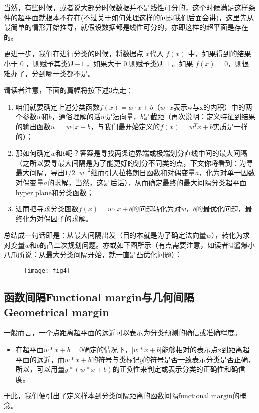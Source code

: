\documentclass[a4paper,12pt]{article}
\begin{document}
当然，有些时候，或者说大部分时候数据并不是线性可分的，这个时候满足这样条件的超平面就根本不存在(不过关于如何处理这样的问题我们后面会讲)，这里先从最简单的情形开始推导，就假设数据都是线性可分的，亦即这样的超平面是存在的。
    
更进一步，我们在进行分类的时候，将数据点 $x$代入 $f(x)$ 中，如果得到的结果小于 $0$ ，则赋予其类别$ -1$ ，如果大于 $0$ 则赋予类别 $1$ 。如果 $f(x)=0$，则很难办了，分到哪一类都不是。

请读者注意，下面的篇幅将按下述3点走：
\begin{enumerate}
\item 咱们就要确定上述分类函数$f(x) = w\cdot x + b$（$w\cdot x$表示w与x的内积）中的两个参数$w$和$b$，通俗理解的话$w$是法向量，$b$是截距（再次说明：定义特征到结果的输出函数$u=\vert w\cdot \vert x-b$，与我们最开始定义的$f(x)=w^Tx+b$实质是一样的）；
\item 那如何确定$w$和$b$呢？答案是寻找两条边界端或极端划分直线中间的最大间隔（之所以要寻最大间隔是为了能更好的划分不同类的点，下文你将看到：为寻最大间隔，导出$1/2||w||^2$继而引入拉格朗日函数和对偶变量$a$，化为对单一因数对偶变量$a$的求解，当然，这是后话），从而确定最终的最大间隔分类超平面hyper plane和分类函数；
\item 进而把寻求分类函数$f(x) = w\cdot x + b$的问题转化为对$w$，$b$的最优化问题，最终化为对偶因子的求解。
\end{enumerate}

总结成一句话即是：从最大间隔出发（目的本就是为了确定法向量$w$），转化为求对变量$w$和$b$的凸二次规划问题。亦或如下图所示（有点需要注意，如读者@酱爆小八爪所说：从最大分类间隔开始，就一直是凸优化问题）：
\begin{figure}[H]
\centering
\texttt{[image: fig4]}
\end{figure}

\subsection{函数间隔Functional margin与几何间隔Geometrical margin }

一般而言，一个点距离超平面的远近可以表示为分类预测的确信或准确程度。

\begin{itemize}
\item 在超平面$w*x+b=0$确定的情况下，$|w*x+b|$能够相对的表示点x到距离超平面的远近，而$w*x+b$的符号与类标记$y$的符号是否一致表示分类是否正确，所以，可以用量$y*(w*x+b)$的正负性来判定或表示分类的正确性和确信度。
\end{itemize}
于此，我们便引出了定义样本到分类间隔距离的函数间隔functional margin的概念。
\end{document}
